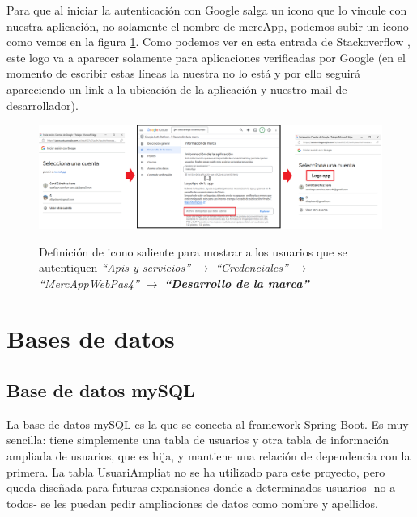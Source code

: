 \documentclass[a4paper,12pt]{report}
\begin{document}
	Para que al iniciar la autenticación con Google salga un icono que lo vincule con nuestra aplicación, no solamente el nombre de mercApp, podemos subir un icono como vemos en la figura \ref{fig:mercAppLogo}. Como podemos ver en esta entrada de Stackoverflow \cite{stackoverflow_oauth_consent_logo}, este logo va a aparecer solamente para aplicaciones verificadas por Google (en el momento de escribir estas líneas la nuestra no lo está y por ello seguirá apareciendo un link a la ubicación de la aplicación y nuestro mail de desarrollador).
	
	\FloatBarrier
	\setlength{\belowcaptionskip}{3pt}
	\begin{figure}[H]
		\centering
		\caption{Definición de icono saliente para mostrar a los usuarios que se autentiquen \textit{``Apis y servicios''} $\rightarrow$ \textit{``Credenciales''} $\rightarrow$ \textit{``MercAppWebPas4''} $\rightarrow$ \textbf{\textit{``Desarrollo de la marca''}}}
		\includegraphics[width=1\linewidth]{img/mercAppLogo}
		\label{fig:mercAppLogo}
	\end{figure}
	\FloatBarrier
	
	
	
	\section{Bases de datos}
	
	\subsection{Base de datos mySQL}
	
	La base de datos mySQL es la que se conecta al framework Spring Boot. Es muy sencilla: tiene simplemente una tabla de usuarios y otra tabla de información ampliada de usuarios, que es hija, y mantiene una relación de dependencia con la primera. La tabla UsuariAmpliat no se ha utilizado para este proyecto, pero queda diseñada para futuras expansiones donde a determinados usuarios -no a todos- se les puedan pedir ampliaciones de datos como nombre y apellidos.
	
\end{document}
